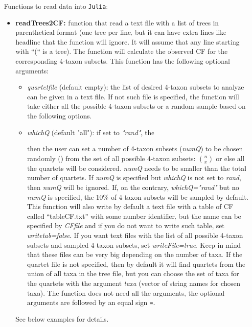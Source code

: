 \documentclass[12pt]{article}
\begin{document}
\noindent Functions to read data into \texttt{Julia}:
\begin{itemize}
\item \textbf{readTrees2CF:} function that read a text file with a
  list of trees in parenthetical format (one tree per line, but it can
  have extra lines like headline that the function will ignore. It
  will assume that any line starting with ``(`` is a tree). The
  function will calculate the observed CF for the corresponding
  4-taxon subsets.
  This function has the following optional arguments:
\begin{itemize}
\item{\textit{quartetfile} (default empty): the list of desired
    4-taxon subsets to analyze can be given in a text file. If not
    such file is specified, the function will take either all the
    possible 4-taxon subsets or a random sample based on the following
    options.}
\item{\textit{whichQ} (default "all"): if set to \textit{"rand"}, the }

  then the user can set a number of 4-taxon subsets (\textit{numQ}) to
  be chosen randomly ()
  from the set of all possible 4-taxon subsets: $n \choose x$ or else all the
  quartets will be considered. \textit{numQ} needs to be
  smaller than the total number of quartets. If \textit{numQ} is
  specified but \textit{whichQ} is not set to \textit{rand}, then
  \textit{numQ} will be ignored. If, on the contrary,
  \textit{whichQ="rand"} but no \textit{numQ} is specified, the 10\%
  of 4-taxon subsets will be sampled by default.
  This function will also write by default a text file
  with a table of CF called ``tableCF.txt'' with some number identifier, but the name can be
  specified by \textit{CFfile} and if you do not want to write such table,
  set \textit{writetab=false}. If you want text files with the list of
  all possible 4-taxon subsets and sampled 4-taxon subsets, set
  \textit{writeFile=true}. Keep in mind that these files can be very
  big depending on the number of taxa. If the quartet file is not specified, then by
  default it will find quartets from the union of all taxa in the tree
  file, but you can choose the set of taxa for the quartets with the
  argument \textit{taxa} (vector of string names for chosen taxa).  The function does not need all the
  arguments, the optional arguments are followed by an equal sign
  \texttt{=}.
\end{itemize}
  See below examples for details.
  \\


\end{itemize}
\end{document}

